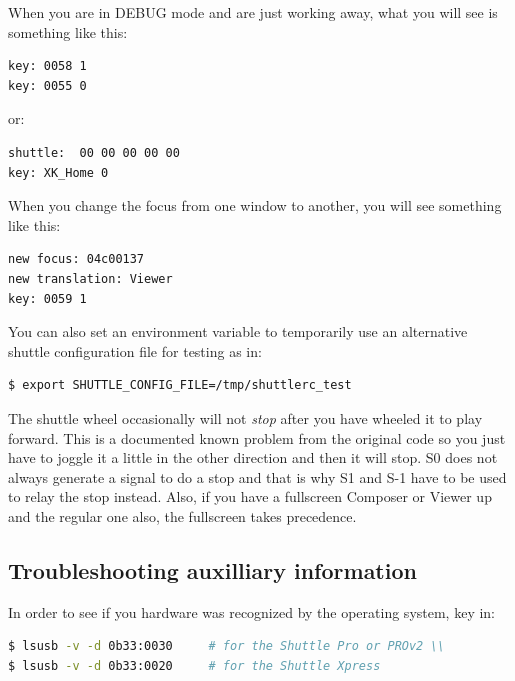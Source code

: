 \noindent When you are in DEBUG mode and are just working away, what you will see is something like this:

\begin{lstlisting}[language=Bash]
key: 0058 1 
key: 0055 0
\end{lstlisting}

or:

\begin{lstlisting}[language=Bash]
shuttle:  00 00 00 00 00 
key: XK_Home 0
\end{lstlisting}

\noindent When you change the focus from one window to another, you will see something like this:

\begin{lstlisting}[language=Bash]
new focus: 04c00137 
new translation: Viewer 
key: 0059 1
\end{lstlisting}

\noindent You can also set an environment variable to temporarily use an alternative shuttle configuration file for testing as in:

\begin{lstlisting}[language=Bash]
$ export SHUTTLE_CONFIG_FILE=/tmp/shuttlerc_test 
\end{lstlisting}

\noindent The shuttle wheel occasionally will not \textit{stop} after you have wheeled it to play forward.  This is a documented known problem from the original code so you just have to joggle it a little in the other direction and then it will stop.  S0 does not always generate a signal to do a stop and that is why S1 and S-1 have to be used to relay the stop instead.  Also, if you have a fullscreen Composer or Viewer up and the regular one also, the fullscreen takes precedence.

\subsection{Troubleshooting auxilliary information}%
\label{sub:troubleshooting_auxilliary_information}

In order to see if you hardware was recognized by the operating system, key in:

\begin{lstlisting}[language=Bash]
$ lsusb -v -d 0b33:0030		# for the Shuttle Pro or PROv2 \\
$ lsusb -v -d 0b33:0020		# for the Shuttle Xpress
\end{lstlisting}


